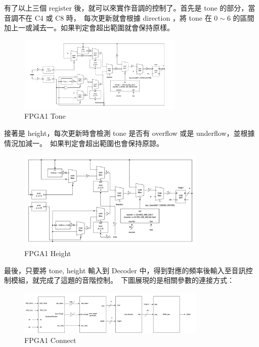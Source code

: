 \documentclass[10.5pt,compsoc,UTF8]{CjC}
\theoremstyle{mystyle}
\begin{document}
有了以上三個 register 後，就可以來實作音調的控制了。首先是 tone 的部分，當音調不在 C4 或 C8 時，\
每次更新就會根據 direction ，將 tone 在 $0 \sim 6$ 的區間加上一或減去一。如果判定會超出範圍就會保持原樣。

\begin{figure}[h!]
  \centering
  \includegraphics[width=0.7\textwidth]{./img/FPGA1-tone.png}
  \caption{FPGA1 Tone}
  \label{fig:FPGA1-tone}
\end{figure}

\newpage

接著是 height，每次更新時會檢測 tone 是否有 overflow 或是 underflow，並根據情況加減一。\
如果判定會超出範圍也會保持原諒。

\begin{figure}[h!]
  \centering
  \includegraphics[width=0.8\textwidth]{./img/FPGA1-height.png}
  \caption{FPGA1 Height}
  \label{fig:FPGA1-height}
\end{figure}


最後，只要將 tone, height 輸入到 Decoder 中，得到對應的頻率後輸入至音訊控制模組，就完成了這題的音階控制。\
下圖展現的是相關參數的連接方式：

\begin{figure}[h!]
  \centering
  \includegraphics[width=0.8\textwidth]{./img/FPGA1-all.png}
  \caption{FPGA1 Connect}
  \label{fig:FPGA1-connect}
\end{figure}
\end{document}
